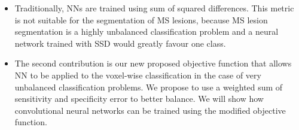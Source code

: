 \begin{itemize}
\item Traditionally, NNs are trained using sum of squared differences. This
metric is not suitable for the segmentation of MS lesions, because MS lesion
segmentation is a highly unbalanced classification problem and a neural network
trained with SSD would greatly favour one class.

\item The second contribution is our new proposed objective function that allows
NN to be applied to the voxel-wise classification in the case of very unbalanced
classification problems. We propose to use a weighted sum of sensitivity and
specificity error to better balance. We will show how convolutional neural
networks can be trained using the modified objective function.

\end{itemize}
